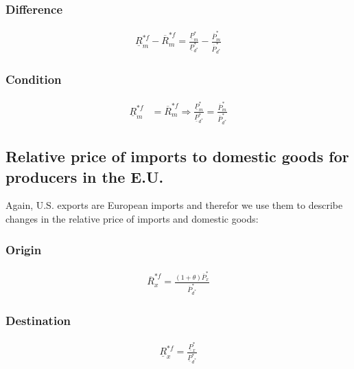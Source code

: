 \subsubsection*{Difference}
\begin{equation}\label{mproeu.diff}
\begin{aligned}
\underline R^{*f}_m - \overline R^{*f}_m = \frac{\underline P^*_m}{\underline P^*_{d^*}} - \frac{\overline P^*_m}{\overline P^*_{d^*}}\end{aligned}  \end{equation}

\subsubsection*{Condition}
\begin{equation}\label{mproeu.con}
\begin{aligned}
    \underline R^{*f}_m &= \overline R^{*f}_m \Rightarrow \frac{\underline P^*_m}{\underline P^*_{d^*}} = \frac{\overline P^*_m}{\overline P^*_{d^*}}
\end{aligned}  \end{equation}

\subsection*{Relative price of imports to domestic goods for producers in the E.U.}
Again, U.S. exports are European imports and therefor we use them to describe changes in the relative price of imports and domestic goods:
\subsubsection*{Origin}
\begin{equation}\label{xproeu.o}
\begin{aligned}
\overline R^{*f}_x = \frac{ \left( 1+\theta \right) \overline P^*_x}{\overline P^*_{d^*}}\end{aligned}  \end{equation}

\subsubsection*{Destination}
\begin{equation}\label{xproeu.d}
\begin{aligned}
\underline R^{*f}_x = \frac{\underline P^*_x}{\underline P^*_{d^*}}\end{aligned}  \end{equation}

